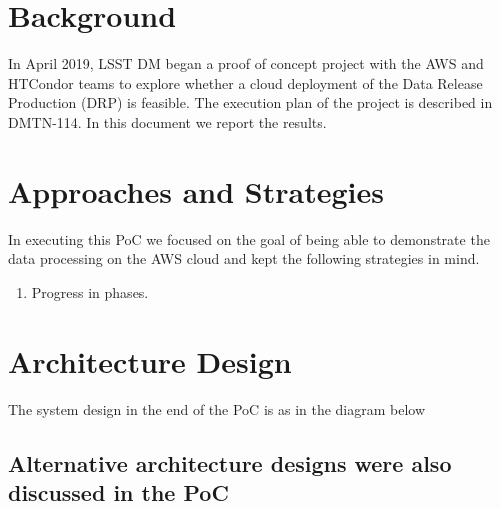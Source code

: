 \section{Background}

In April 2019, LSST DM began a proof of concept project with the AWS and HTCondor teams to explore whether a cloud deployment of the Data Release Production (DRP) is feasible. The execution plan of the project is described in DMTN-114.  In this document we report the results.



\section{Approaches and Strategies}

In executing this PoC we focused on the goal of being able to demonstrate the data processing on the AWS cloud and kept the following strategies in mind.



\begin{enumerate}
\item
Progress in phases.
\end{enumerate}


\section{Architecture Design}

The system design in the end of the PoC is as in the diagram below

\subsection{Alternative architecture designs were also discussed in the PoC}

